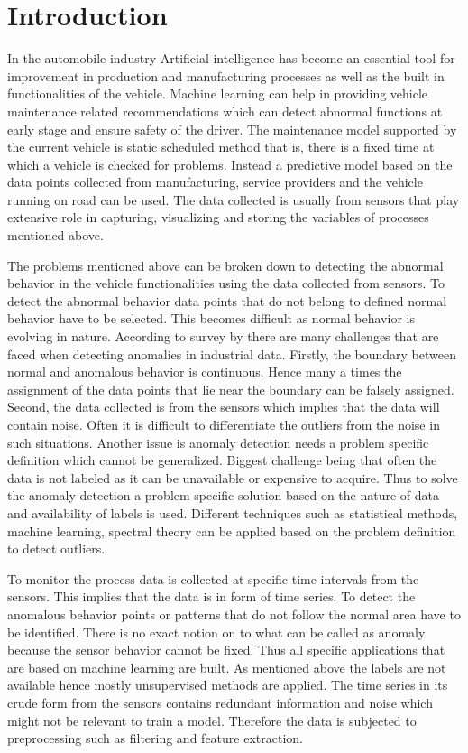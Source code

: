 

    \chapter{Introduction}
In the automobile industry Artificial intelligence has become an essential tool for improvement in production and manufacturing processes as well as the built in functionalities of the vehicle. Machine learning can help in providing vehicle maintenance related recommendations which can detect abnormal functions at early stage and ensure safety of the driver. The maintenance model supported by the current vehicle is static scheduled method that is, there is a fixed time at which a vehicle is checked for problems. Instead a predictive model based on the data points collected from manufacturing, service providers and the vehicle running on road can be used. The data collected is usually from sensors that play extensive role in capturing, visualizing and storing the variables of processes mentioned above.

The problems mentioned above can be broken down to detecting the abnormal behavior in the vehicle functionalities using the data collected from sensors. To detect the abnormal behavior data points that do not belong to defined normal behavior have to be selected. This becomes difficult as normal behavior is evolving in nature. According to survey by \cite{chandola2009anomaly} there are many challenges that are faced when detecting anomalies in industrial data. Firstly, the boundary between normal and anomalous behavior is continuous. Hence many a times the assignment of the data points that lie near the boundary can be falsely assigned. Second, the data collected is from the sensors which implies that the data will contain noise. Often it is difficult to differentiate the outliers from the noise in such situations. Another issue is anomaly detection needs a problem specific definition which cannot be generalized. Biggest challenge being that often the data is not labeled as it can be unavailable or expensive to acquire. Thus to solve the anomaly detection a problem specific solution based on the nature of data and availability of labels is used. Different techniques such as statistical methods, machine learning, spectral theory can be applied based on the problem definition to detect outliers. 

To monitor the process data is collected at specific time intervals from the sensors. This implies that the data is in form of time series. To detect the anomalous behavior points or patterns that do not follow the normal area have to be identified. There is no exact notion on to what can be called as anomaly because the sensor behavior cannot be fixed. Thus all specific applications that are based on machine learning are built. As mentioned above the labels are not available hence mostly unsupervised methods are applied. The time series in its crude form from the sensors contains redundant information and noise which might not be relevant to train a model. Therefore the data is subjected to preprocessing such as filtering and feature extraction. 

